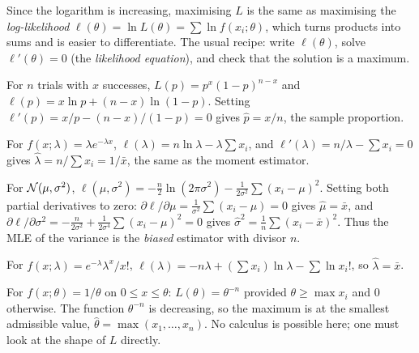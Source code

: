 Since the logarithm is increasing, maximising $L$ is the same as maximising the \emph{log-likelihood} $\ell(\theta)=\ln L(\theta)=\sum\ln f(x_i;\theta)$, which turns products into sums and is easier to differentiate. The usual recipe: write $\ell(\theta)$, solve $\ell'(\theta)=0$ (the \emph{likelihood equation}), and check that the solution is a maximum.

\begin{example}[Bernoulli]\label{ex:mlebern}
For $n$ trials with $x$ successes, $L(p)=p^x(1-p)^{n-x}$ and $\ell(p)=x\ln p+(n-x)\ln(1-p)$. Setting $\ell'(p)=x/p-(n-x)/(1-p)=0$ gives $\hat{p}=x/n$, the sample proportion.
\end{example}

\begin{example}[Exponential]\label{ex:mleexp}
For $f(x;\lambda)=\lambda e^{-\lambda x}$, $\ell(\lambda)=n\ln\lambda-\lambda\sum x_i$, and $\ell'(\lambda)=n/\lambda-\sum x_i=0$ gives $\hat\lambda=n/\sum x_i=1/\bar{x}$, the same as the moment estimator.
\end{example}

\begin{example}[Normal]\label{ex:mlenormal}
For $\mathcal{N}(\mu,\sigma^2)$, $\ell(\mu,\sigma^2)=-\frac n2\ln(2\pi\sigma^2)-\frac1{2\sigma^2}\sum(x_i-\mu)^2$. Setting both partial derivatives to zero: $\partial\ell/\partial\mu=\frac1{\sigma^2}\sum(x_i-\mu)=0$ gives $\hat\mu=\bar{x}$, and $\partial\ell/\partial\sigma^2=-\frac n{2\sigma^2}+\frac1{2\sigma^4}\sum(x_i-\mu)^2=0$ gives $\hat\sigma^2=\frac1n\sum(x_i-\bar{x})^2$. Thus the MLE of the variance is the \emph{biased} estimator with divisor $n$.
\end{example}

\begin{example}[Poisson]
For $f(x;\lambda)=e^{-\lambda}\lambda^x/x!$, $\ell(\lambda)=-n\lambda+(\sum x_i)\ln\lambda-\sum\ln x_i!$, so $\hat\lambda=\bar{x}$.
\end{example}

\begin{example}\label{ex:mleunif}
For $f(x;\theta)=1/\theta$ on $0\le x\le\theta$: $L(\theta)=\theta^{-n}$ provided $\theta\ge\max x_i$ and $0$ otherwise. The function $\theta^{-n}$ is decreasing, so the maximum is at the smallest admissible value, $\hat\theta=\max(x_1,\dots,x_n)$. No calculus is possible here; one must look at the shape of $L$ directly.
\end{example}

